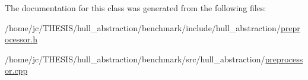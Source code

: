 The documentation for this class was generated from the following files\+:\begin{DoxyCompactItemize}
\item 
/home/jc/\+T\+H\+E\+S\+I\+S/hull\+\_\+abstraction/benchmark/include/hull\+\_\+abstraction/\hyperlink{benchmark_2include_2hull__abstraction_2preprocessor_8h}{preprocessor.\+h}\item 
/home/jc/\+T\+H\+E\+S\+I\+S/hull\+\_\+abstraction/benchmark/src/hull\+\_\+abstraction/\hyperlink{benchmark_2src_2hull__abstraction_2preprocessor_8cpp}{preprocessor.\+cpp}\end{DoxyCompactItemize}
